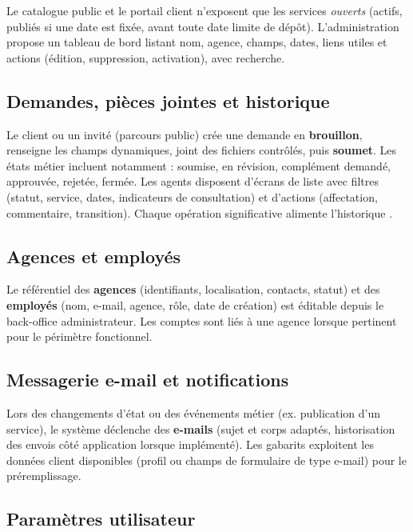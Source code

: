 Le catalogue public et le portail client n'exposent que les services \emph{ouverts} (actifs, publiés si une date est fixée, avant toute date limite de dépôt). L'administration propose un tableau de bord listant nom, agence, champs, dates, liens utiles et actions (édition, suppression, activation), avec recherche.

\subsection{Demandes, pièces jointes et historique}

Le client ou un invité (parcours public) crée une demande en \textbf{brouillon}, renseigne les champs dynamiques, joint des fichiers contrôlés, puis \textbf{soumet}. Les états métier incluent notamment : soumise, en révision, complément demandé, approuvée, rejetée, fermée. Les agents disposent d'écrans de liste avec filtres (statut, service, dates, indicateurs de consultation) et d'actions (affectation, commentaire, transition). Chaque opération significative alimente l'historique \cite{date2003,kleppmann2017}.

\subsection{Agences et employés}

Le référentiel des \textbf{agences} (identifiants, localisation, contacts, statut) et des \textbf{employés} (nom, e-mail, agence, rôle, date de création) est éditable depuis le back-office administrateur. Les comptes sont liés à une agence lorsque pertinent pour le périmètre fonctionnel.

\subsection{Messagerie e-mail et notifications}

Lors des changements d'état ou des événements métier (ex. publication d'un service), le système déclenche des \textbf{e-mails} (sujet et corps adaptés, historisation des envois côté application lorsque implémenté). Les gabarits exploitent les données client disponibles (profil ou champs de formulaire de type e-mail) pour le préremplissage.

\subsection{Paramètres utilisateur}

